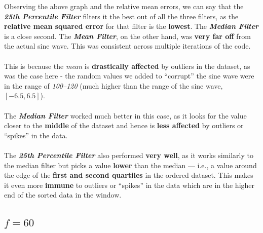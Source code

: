 \documentclass{report}
\begin{document}
\begin{tcolorbox}[colback=green!5!white,colframe=green!50!black,title=\textbf{Observation from Graph and Relative Mean Errors}]
Observing the above graph and the relative mean errors, we can say that the \textbf{\textit{25th Percentile Filter}} filters it the best out of all the three filters, as the \textbf{relative mean squared error} for that filter is the \textbf{lowest}.  
The \textbf{\textit{Median Filter}} is a close second.  
The \textbf{\textit{Mean Filter}}, on the other hand, was \textbf{very far off} from the actual sine wave. This was consistent across multiple iterations of the code.
\end{tcolorbox}

\paragraph{} This is because the \textit{mean} is \textbf{drastically affected} by outliers in the dataset, as was the case here - the random values we added to “corrupt” the sine wave were in the range of \textit{100–120} (much higher than the range of the sine wave, $[-6.5, 6.5]$).

\paragraph{} The \textbf{\textit{Median Filter}} worked much better in this case, as it looks for the value closer to the \textbf{middle} of the dataset and hence is \textbf{less affected} by outliers or “spikes” in the data.

\paragraph{} The \textbf{\textit{25th Percentile Filter}} also performed \textbf{very well}, as it works similarly to the median filter but picks a value \textbf{lower} than the median — i.e., a value around the edge of the \textbf{first and second quartiles} in the ordered dataset. This makes it even more \textbf{immune} to outliers or “spikes” in the data which are in the higher end of the sorted data in the window.


\subsection*{\textbf{$f = 60$}}
\end{document}
